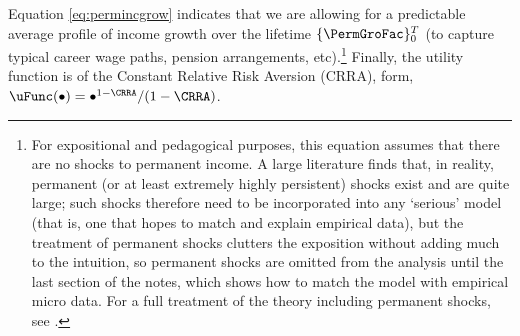 \documentclass[titlepage, headings=optiontotocandhead]{\econtex}
\begin{document}
Equation \eqref{eq:permincgrow} indicates that we are allowing for a predictable average profile of income growth over the lifetime $\{\PermGroFac\}_{0}^{T}$ (to capture typical career wage paths, pension arrangements, etc).\footnote{For expositional and pedagogical purposes, this equation assumes that there are no shocks to permanent income.  A large literature finds that, in reality, permanent (or at least extremely highly persistent) shocks exist and are quite large; such shocks therefore need to be incorporated into any `serious' model (that is, one that hopes to match and explain empirical data), but the treatment of permanent shocks clutters the exposition without adding much to the intuition, so permanent shocks are omitted from the analysis until the last section of the notes, which shows how to match the model with empirical micro data.  For a full treatment of the theory including permanent shocks, see \cite{BufferStockTheory}.}  %
Finally, the utility function is of the Constant Relative Risk Aversion (CRRA), form, $\uFunc(\bullet) = \bullet^{1-\CRRA}/(1-\CRRA)$.
\end{document}

